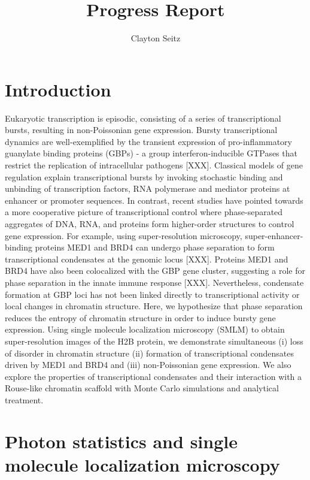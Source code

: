 \documentclass{article}
\begin{document}
\title{Progress Report}
\author{Clayton Seitz}
\maketitle
\thispagestyle{empty}


\section{Introduction}

Eukaryotic transcription is episodic, consisting of a series of transcriptional bursts, resulting in non-Poissonian gene expression. Bursty transcriptional dynamics are well-exemplified by the transient expression of pro-inflammatory guanylate binding proteins (GBPs) - a group interferon-inducible GTPases that restrict the replication of intracellular pathogens [XXX]. Classical models of gene regulation explain transcriptional bursts by invoking stochastic binding and unbinding of transcription factors, RNA polymerase and mediator proteins at enhancer or promoter sequences. In contrast, recent studies have pointed towards a more cooperative picture of transcriptional control where phase-separated aggregates of DNA, RNA, and proteins form higher-order structures to control gene expression. For example, using super-resolution microscopy, super-enhancer-binding proteins MED1 and BRD4 can undergo phase separation to form transcriptional condensates at the genomic locus [XXX]. Proteins MED1 and BRD4 have also been colocalized with the GBP gene cluster, suggesting a role for phase separation in the innate immune response [XXX]. Nevertheless, condensate formation at GBP loci has not been linked directly to transcriptional activity or local changes in chromatin structure. Here, we hypothesize that phase separation reduces the entropy of chromatin structure in order to induce bursty gene expression. Using single molecule localization microscopy (SMLM) to obtain super-resolution images of the H2B protein, we demonstrate simultaneous (i) loss of disorder in chromatin structure (ii) formation of transcriptional condensates driven by MED1 and BRD4 and (iii) non-Poissonian gene expression. We also explore the properties of transcriptional condensates and their interaction with a Rouse-like chromatin scaffold with Monte Carlo simulations and analytical treatment.

\section{Photon statistics and single molecule localization microscopy}
\end{document}
